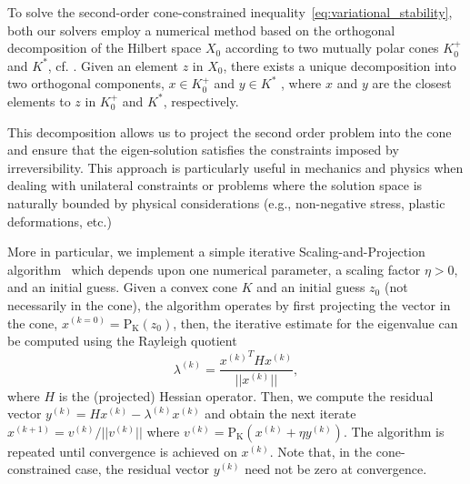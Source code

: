 To solve the second-order cone-constrained inequality~\eqref{eq:variational_stability}, {both our solvers} employ a numerical method based on the orthogonal decomposition of the Hilbert space  $X_0$  according to two mutually polar cones  $K^+_0$  and  $K^*$, cf. \cite{Moreau1962-fz}. Given an element  $z$  in  $X_0$, there exists a unique decomposition into two orthogonal components,  $x \in K^+_0$  and  $y \in K^*$ , where  $x$  and  $y$  are the closest elements to  $z$ in  $K^+_0$  and  $K^*$, respectively.

This decomposition allows us to project the second order problem into the cone and ensure that the eigen-solution satisfies the constraints imposed by irreversibility. This approach is particularly useful in mechanics and physics when dealing with unilateral constraints or problems where the solution space is naturally bounded by physical considerations (e.g., non-negative stress, plastic deformations, etc.)

More in particular, we implement a simple iterative Scaling-and-Projection algorithm~\cite{Pinto_da_Costa2010-qv} which depends upon one numerical parameter, a scaling factor $\eta>0$, {and an initial guess}. Given a convex cone  $K$ and an initial guess $z_0$ (not necessarily in the cone), the algorithm operates by first projecting the vector in the cone, $x^{(k=0)}= \operatorname{P_K}(z_0)$, then, the iterative estimate for the eigenvalue can be computed using the Rayleigh quotient
\begin{equation}
    \lambda^{(k)} = \frac{{x^{(k)}}^T H x^{(k)}}{||x^{(k)}||},
\end{equation}
where $H$ is the {(projected)} Hessian operator. Then, we compute the residual vector $y^{(k)} = H x^{(k)} - \lambda^{(k)} x^{(k)}$ and obtain the next iterate $x^{(k+1)} = v^{(k)}/||v^{(k)}||$ where
$v^{(k)} =\operatorname{P_K} (x^{(k)} + \eta y^{(k)})$.
The algorithm is repeated until convergence is achieved {on $x^{(k)}$}. Note that, in the cone-constrained case, the residual vector $y^{(k)}$ need not be zero at convergence.

